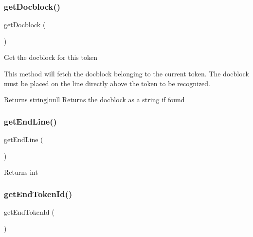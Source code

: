 \subsubsection{\texorpdfstring{get\+Docblock()}{getDocblock()}}
{\footnotesize\ttfamily get\+Docblock (\begin{DoxyParamCaption}{ }\end{DoxyParamCaption})}

Get the docblock for this token

This method will fetch the docblock belonging to the current token. The docblock must be placed on the line directly above the token to be recognized.

\begin{DoxyReturn}{Returns}
string$\vert$null Returns the docblock as a string if found 
\end{DoxyReturn}
\mbox{\label{class_p_h_p___token_with_scope_a7ad149e4075bba710a8933065263fe0e}} 
\subsubsection{\texorpdfstring{get\+End\+Line()}{getEndLine()}}
{\footnotesize\ttfamily get\+End\+Line (\begin{DoxyParamCaption}{ }\end{DoxyParamCaption})}

\begin{DoxyReturn}{Returns}
int 
\end{DoxyReturn}
\mbox{\label{class_p_h_p___token_with_scope_a305594b44c2294a5d668476c7d5e690a}} 
\subsubsection{\texorpdfstring{get\+End\+Token\+Id()}{getEndTokenId()}}
{\footnotesize\ttfamily get\+End\+Token\+Id (\begin{DoxyParamCaption}{ }\end{DoxyParamCaption})}

